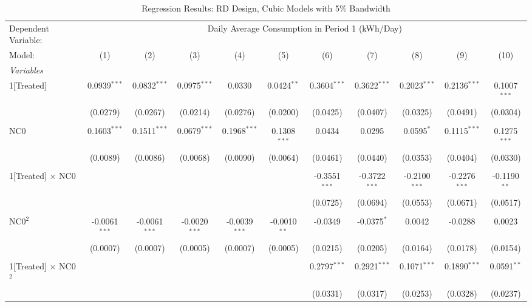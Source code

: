 \begin{table}[htbp]
\centering
\caption{\label{Table:Regression-Results_RD_Cubic_BW-5} Regression Results: RD Design, Cubic Models with 5\% Bandwidth}
\begin{adjustbox}{scale = 0.7}
\begin{tabular}{lcccccccccc}
\tabularnewline\toprule\toprule
Dependent Variable:&\multicolumn{10}{c}{Daily Average Consumption in Period 1 (kWh/Day)}\\
Model:&(1) & (2) & (3) & (4) & (5) & (6) & (7) & (8) & (9) & (10)\\
\midrule
\emph{Variables}&   &   &   &   &   &   &   &   &   &  \\
1[Treated]&0.0939$^{***}$ & 0.0832$^{***}$ & 0.0975$^{***}$ & 0.0330 & 0.0424$^{**}$ & 0.3604$^{***}$ & 0.3622$^{***}$ & 0.2023$^{***}$ & 0.2136$^{***}$ & 0.1007$^{***}$\\
  &(0.0279) & (0.0267) & (0.0214) & (0.0276) & (0.0200) & (0.0425) & (0.0407) & (0.0325) & (0.0491) & (0.0304)\\
&   &   &   &   &   &   &   &   &   &  \\
NC0&0.1603$^{***}$ & 0.1511$^{***}$ & 0.0679$^{***}$ & 0.1968$^{***}$ & 0.1308$^{***}$ & 0.0434 & 0.0295 & 0.0595$^{*}$ & 0.1115$^{***}$ & 0.1275$^{***}$\\
  &(0.0089) & (0.0086) & (0.0068) & (0.0090) & (0.0064) & (0.0461) & (0.0440) & (0.0353) & (0.0404) & (0.0330)\\
&   &   &   &   &   &   &   &   &   &  \\
1[Treated] $\times $ NC0&   &    &    &    &    & -0.3551$^{***}$ & -0.3722$^{***}$ & -0.2100$^{***}$ & -0.2276$^{***}$ & -0.1190$^{**}$\\
  &   &    &    &    &    & (0.0725) & (0.0694) & (0.0553) & (0.0671) & (0.0517)\\
&   &   &   &   &   &   &   &   &   &  \\
NC0$^2$&-0.0061$^{***}$ & -0.0061$^{***}$ & -0.0020$^{***}$ & -0.0039$^{***}$ & -0.0010$^{**}$ & -0.0349 & -0.0375$^{*}$ & 0.0042 & -0.0288 & 0.0023\\
  &(0.0007) & (0.0007) & (0.0005) & (0.0007) & (0.0005) & (0.0215) & (0.0205) & (0.0164) & (0.0178) & (0.0154)\\
&   &   &   &   &   &   &   &   &   &  \\
1[Treated] $\times $ NC0$^2$&   &    &    &    &    & 0.2797$^{***}$ & 0.2921$^{***}$ & 0.1071$^{***}$ & 0.1890$^{***}$ & 0.0591$^{**}$\\
  &   &    &    &    &    & (0.0331) & (0.0317) & (0.0253) & (0.0328) & (0.0237)\\

\end{tabular}
\end{adjustbox}
\end{table}

